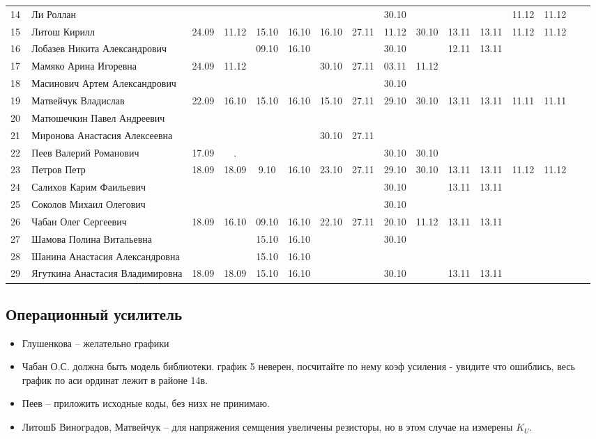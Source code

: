 \begin{tabular}{l|llccccccccccccc}
14\,& Ли Роллан                       &     &     &     &      &     &      &30.10&&&& 11.12&11.12\\
15\,& Литош Кирилл                    &24.09&11.12&15.10&16.10 &16.10&27.11 &11.12&30.10&13.11&13.11&11.12&11.12\\
\midrule
16\,& Лобазев Никита Александрович    &     &     &09.10&16.10 &     &      &30.10&     &12.11&13.11\\
17\,& Мамяко Арина Игоревна           &24.09&11.12&     &      &30.10&27.11 &03.11&11.12\\
18\,& Масинович Артем Александрович   &     &     &     &      &     &      &30.10&\\
19\,& Матвейчук Владислав             &22.09&16.10&15.10&16.10 &15.10&27.11 &29.10&30.10&13.11&13.11&11.11&11.11\\
20\,& Матюшечкин Павел Андреевич      \\
\midrule
21\,& Миронова Анастасия Алексеевна   &     &     &     &      &30.10&27.11&\\
22\,& Пеев Валерий Романович          &17.09& .   &     &      &     &      &30.10&30.10\\
23\,& Петров Петр                     &18.09&18.09& 9.10&16.10 &23.10&27.11 &29.10&30.10&13.11&13.11&11.12&11.12\\
24\,& Салихов Карим Фаильевич         &     &     &     &      &     &      &30.10&     &13.11&13.11\\
25\,& Соколов Михаил Олегович         &     &     &     &      &     &      &30.10&\\
\midrule
26\,& Чабан Олег Сергеевич            &18.09&16.10&09.10&16.10&22.10 &27.11 &20.10&11.12&13.11&13.11\\
27\,& Шамова Полина Витальевна        &    &      &15.10&16.10 &     &      &30.10&\\
28\,& Шанина Анастасия Александровна  &    &      &15.10&16.10 &     &      &\\
29\,& Ягуткина Анастасия Владимировна &18.09&18.09&15.10&16.10 &     &      &30.10&     &13.11&13.11\\
\bottomrule
\end{tabular}


\subsection*{Операционный усилитель}
\begin{itemize}
\item Глушенкова -- желательно графики
\item Чабан О.С. должна быть модель библиотеки. график 5 неверен, посчитайте по нему коэф усиления - увидите что ошиблись, весь график по аси ординат лежит в районе 14в.
\item Пеев  -- приложить исходные коды, без низх не принимаю.
\item ЛитошБ Виноградов, Матвейчук -- для напряжения семщения увеличены резисторы, но в этом случае на измерены $K_U$.
\end{itemize}

